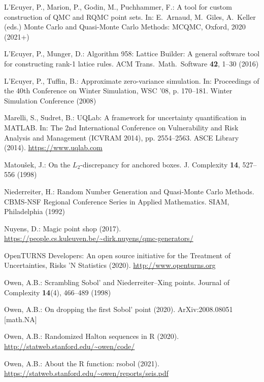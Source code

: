\documentclass[graybox]{svmult}
\begin{document}
\begin{thebibliography}{10}
L'Ecuyer, P., Marion, P., Godin, M., Puchhammer, F.: A tool for custom
  construction of {QMC} and {RQMC} point sets.
\newblock In: E.~Arnaud, M.~Giles, A.~Keller (eds.) {M}onte {C}arlo and
  Quasi-{M}onte {C}arlo Methods: {MCQMC}, {O}xford, 2020 (2021+)

L'Ecuyer, P., Munger, D.: Algorithm 958: {Lattice Builder}: A general software
  tool for constructing rank-1 latice rules.
\newblock ACM Trans.\ Math.\ Software \textbf{42}, 1--30 (2016)

L'Ecuyer, P., Tuffin, B.: Approximate zero-variance simulation.
\newblock In: Proceedings of the 40th Conference on Winter Simulation, WSC '08,
  p. 170–181. Winter Simulation Conference (2008)

Marelli, S., Sudret, B.: {UQLab}: {A} framework for uncertainty quantification
  in {MATLAB}.
\newblock In: The 2nd International Conference on Vulnerability and Risk
  Analysis and Management {(ICVRAM 2014)}, pp. 2554--2563. ASCE Library (2014).
\newblock \urlprefix\url{https://www.uqlab.com}

Matou\v{s}ek, J.: On the {$L_2$}-discrepancy for anchored boxes.
\newblock J. Complexity \textbf{14}, 527--556 (1998)

Niederreiter, H.: Random Number Generation and Quasi-{M}onte {C}arlo Methods.
\newblock CBMS-NSF Regional Conference Series in Applied Mathematics. SIAM,
  Philadelphia (1992)

Nuyens, D.: Magic point shop (2017).
\newblock
  \urlprefix\url{https://people.cs.kuleuven.be/~dirk.nuyens/qmc-generators/}

{OpenTURNS Developers}: An open source initiative for the {T}reatment of
  {U}ncertainties, {R}isks '{N} {S}tatistics (2020).
\newblock \urlprefix\url{http://www.openturns.org}

Owen, A.B.: Scrambling {S}obol' and {N}iederreiter--{X}ing points.
\newblock Journal of Complexity \textbf{14}(4), 466--489 (1998)

Owen, A.B.: On dropping the first {S}obol' point (2020).
\newblock ArXiv:2008.08051 [math.NA]

Owen, A.B.: Randomized {H}alton sequences in {R} (2020).
\newblock \urlprefix\url{http://statweb.stanford.edu/~owen/code/}

Owen, A.B.: About the {R} function: rsobol  (2021).
\newblock \urlprefix\url{https://statweb.stanford.edu/~owen/reports/seis.pdf}


\end{thebibliography}
\end{document}
